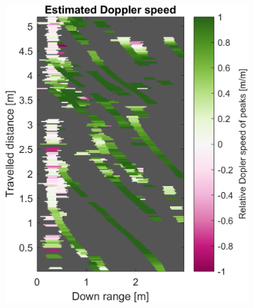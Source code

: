 \begin{figure}[htbp]
\begin{subfigure}[t]{0.475\linewidth}
        \includegraphics[width=\linewidth,max height=.475\textheight]{gfx/results/racetrack_doppler.png}
    \end{subfigure}\bigskip\\
    \begin{subfigure}[t]{0.475\linewidth}
        \centering

\end{subfigure}
\end{figure}
